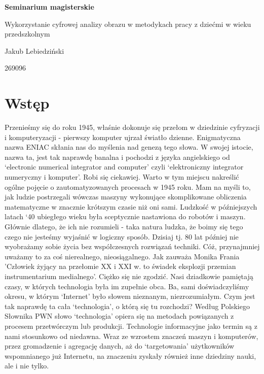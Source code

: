 \documentclass{article}
\begin{document}

\centerline{\textbf{\Large Seminarium magisterskie}}
\vspace{10mm}
{\Large Wykorzystanie cyfrowej analizy obrazu w metodykach pracy z dziećmi w wieku przedszkolnym}

\vspace{10mm}
\centerline{\large Jakub Lebiedziński} 
\vspace{1mm}
\centerline{\normalsize {269096}} 
\vspace{5mm} 

\linespread{1.3} %
\large %

\section*{\textbf{Wstęp}}
Przenieśmy się do roku 1945, właśnie dokonuje się przełom w dziedzinie cyfryzacji i komputeryzacji - pierwszy komputer ujrzał światło dzienne. Enigmatyczna nazwa ENIAC skłania nas do myślenia nad genezą tego słowa. W swojej istocie, nazwa ta, jest tak naprawdę banalna i pochodzi z języka angielskiego od ‘electronic numerical integrator and computer’ czyli ‘elektroniczny integrator numeryczny i komputer’. Robi się ciekawiej. Warto w tym miejscu nakreślić ogólne pojęcie o  zautomatyzowanych procesach w 1945 roku. Mam na myśli to, jak ludzie postrzegali wówczas maszyny wykonujące skomplikowane obliczenia matematyczne w znacznie krótszym czasie niż oni sami. Ludzkość w późniejszych latach ‘40 ubiegłego wieku była sceptycznie nastawiona do robotów i maszyn. Głównie dlatego, że ich nie rozumieli - taka natura ludzka, że boimy się tego czego nie jesteśmy wyjaśnić w logiczny sposób.
Dzisiaj tj. 80 lat później nie wyobrażamy sobie życia bez współczesnych rozwiązań techniki. Cóż, przynajmniej uważamy to za coś nierealnego, nieosiągalnego. Jak zauważa Monika Frania 'Człowiek żyjący na przełomie XX i XXI w. to świadek eksplozji przemian instrumentarium medialnego'. Ciężko się nie zgodzić. Nasi dziadkowie pamiętają czasy, w których technologia była im zupełnie obca. Ba, sami doświadczyliśmy okresu, w którym ‘Internet’ było słowem nieznanym, niezrozumiałym. Czym jest tak naprawdę ta cała ‘technologia’, o którą się tu rozchodzi? Według Polskiego Słownika PWN słowo ‘technologia’ opiera się na metodach powiązanych z procesem przetwórczym lub produkcji. Technologie informacyjne jako termin są z nami stosunkowo od niedawna. Wraz ze wzrostem znaczeń maszyn i komputerów, przez gromadzenie i agregację danych, aż do ‘targetowania’ użytkowników wspomnianego już Internetu, na znaczeniu zyskały również inne dziedziny nauki, ale i nie tylko.
\end{document}

